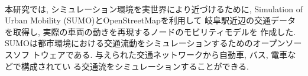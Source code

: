 \\
\indent 本研究では, シミュレーション環境を実世界により近づけるために, 
Simulation of Urban Mobility (SUMO)\cite{sumo}とOpenStreetMapを利用して
岐阜駅近辺の交通データを取得し, 実際の車両の動きを再現するノードのモビリティモデルを
作成した. SUMOは都市環境における交通流動をシミュレーションするためのオープンソースソフ
トウェアである. 与えられた交通ネットワークから自動車, バス, 電車などで構成されてい
る交通流をシミュレーションすることができる. \\[1em]